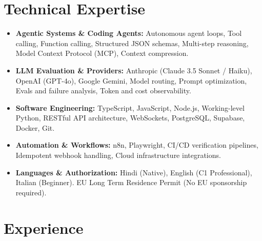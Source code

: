 \documentclass[10pt,a4paper]{article}
\begin{document}
\section{Technical Expertise}
\begin{itemize}
  \item \textbf{Agentic Systems \& Coding Agents:} Autonomous agent loops, Tool calling, Function calling, Structured JSON schemas, Multi-step reasoning, Model Context Protocol (MCP), Context compression.
  \item \textbf{LLM Evaluation \& Providers:} Anthropic (Claude 3.5 Sonnet / Haiku), OpenAI (GPT-4o), Google Gemini, Model routing, Prompt optimization, Evals and failure analysis, Token and cost observability.
  \item \textbf{Software Engineering:} TypeScript, JavaScript, Node.js, Working-level Python, RESTful API architecture, WebSockets, PostgreSQL, Supabase, Docker, Git.
  \item \textbf{Automation \& Workflows:} n8n, Playwright, CI/CD verification pipelines, Idempotent webhook handling, Cloud infrastructure integrations.
  \item \textbf{Languages \& Authorization:} Hindi (Native), English (C1 Professional), Italian (Beginner). EU Long Term Residence Permit (No EU sponsorship required).
\end{itemize}

\section{Experience}
\end{document}
